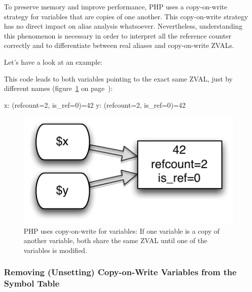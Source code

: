 To preserve memory and improve performance, PHP uses a copy-on-write strategy for variables that are copies of one another. This copy-on-write strategy has no direct im\-pact on alias analysis whatsoever. Nevertheless, understanding this phenomenon is necessary in order to interpret all the reference counter correctly and to differentiate between real aliases and copy-on-write ZVALs.

Let's have a look at an example:


This code leads to both variables pointing to the exact same ZVAL, just by different names (figure~\ref{fig:copy-on-write-variable} on page~\pageref{fig:copy-on-write-variable}):

\begin{textcode}
x: (refcount=2, is_ref=0)=42
y: (refcount=2, is_ref=0)=42
\end{textcode}

\begin{figure}[htb]
  \begin{center}
    \includegraphics[scale=0.8]{images/x_y_42}
    \caption{PHP uses copy-on-write for variables: If one variable is a copy of another variable, both share the same ZVAL until one of the variables is modified.}
    \label{fig:copy-on-write-variable}
  \end{center}
\end{figure}


\subsubsection{Removing (Unsetting) Copy-on-Write Variables from the Symbol Table}
\label{sec:unsetting}

